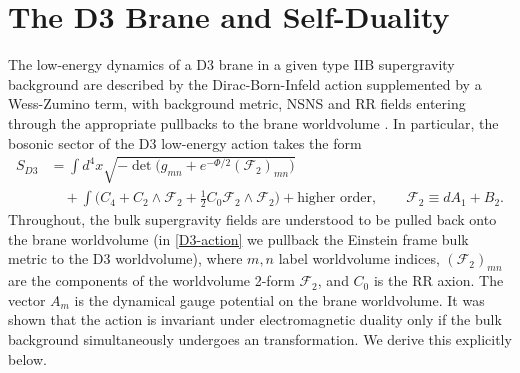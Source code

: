\section{The D3 Brane and Self-Duality}
\label{sec:d3-self-duality}
The low-energy dynamics of a D3 brane in a given type IIB supergravity background are described by the Dirac-Born-Infeld action supplemented by a Wess-Zumino term, with background metric, NSNS and RR fields entering through the appropriate pullbacks to the brane worldvolume \cite{Leigh:1989jq,Polchinski:1998rr}.
In particular, the bosonic sector of the D3 low-energy action takes the form \cite{Tseytlin:1996it}
\begin{equation}
\begin{aligned}
S_{D3}
&=\int d^4x \sqrt{-\det\big({g}_{mn} + e^{-\Phi/2} (\mathcal{F}_2)_{mn}\big)}\\
&\quad+\int \Big(C_4 + C_2\wedge \mathcal{F}_2 + \tfrac{1}{2} C_0 \mathcal{F}_2\wedge\mathcal{F}_2\Big)
+\text{higher order},\qquad
\mathcal{F}_2 \equiv dA_1+B_2 .
\end{aligned}
\label{D3-action}
\end{equation}
Throughout, the bulk supergravity fields are understood to be pulled back onto the brane worldvolume (in \eqref{D3-action} we pullback the Einstein frame bulk metric to the D3 worldvolume), where $m,n$ label worldvolume indices, $(\mathcal{F}_2)_{mn}$ are the components of the worldvolume 2-form $\mathcal{F}_2$, and $C_0$ is the RR axion.
The vector $A_m$ is the dynamical gauge potential on the brane worldvolume.
It was shown \cite{Tseytlin:1996it} that the action is invariant under electromagnetic duality only if the bulk background simultaneously undergoes an \SLZ{} transformation.
We derive this explicitly below.

